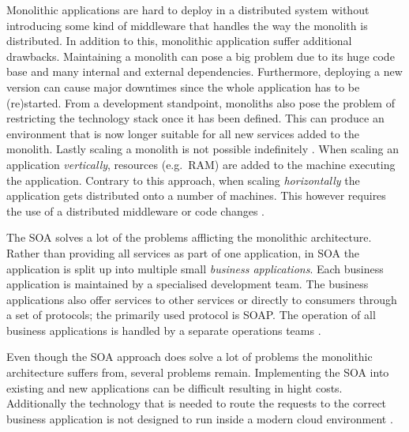 Monolithic applications are hard to deploy in a distributed system without
introducing some kind of middleware that handles the way the monolith is
distributed. In addition to this, monolithic application suffer additional
drawbacks. Maintaining a monolith can pose a big problem due to its huge code
base and many internal and external dependencies. Furthermore, deploying a new
version can cause major downtimes since the whole application has to be
(re)started. From a development standpoint, monoliths also pose the problem of
restricting the technology stack once it has been defined. This can produce an
environment that is now longer suitable for all new services added to the
monolith. Lastly scaling a monolith is not possible indefinitely \autocite[p.
2]{DragoniMicroservicesyesterdaytoday2016}. When scaling an application
\textit{vertically}, resources (e.g.\ RAM) are added to the machine executing
the application. Contrary to this approach, when scaling \textit{horizontally}
the application gets distributed onto a number of machines. This however
requires the use of a distributed middleware or code changes \autocite[Ch.
1.1.1]{LuksaKubernetesAction2017}.

The \ac{SOA} solves a lot of the problems afflicting the monolithic
architecture. Rather than providing all services as part of one application, in
\ac{SOA} the application is split up into multiple small \textit{business
applications}. Each business application is maintained by a specialised
development team. The business applications also offer services to other
services or directly to consumers through a set of protocols; the primarily
used protocol is \ac{SOAP}. The operation of all business applications is
handled by a separate operations teams \autocite[p.
584]{VillamizarEvaluatingmonolithicmicroservice2015}.

Even though the \ac{SOA} approach does solve a lot of problems the monolithic
architecture suffers from, several problems remain. Implementing the \ac{SOA}
into existing and new applications can be difficult resulting in hight costs.
Additionally the technology that is needed to route the requests to the correct
business application is not designed to run inside a modern cloud environment
\autocite[p. 584]{VillamizarEvaluatingmonolithicmicroservice2015}.
